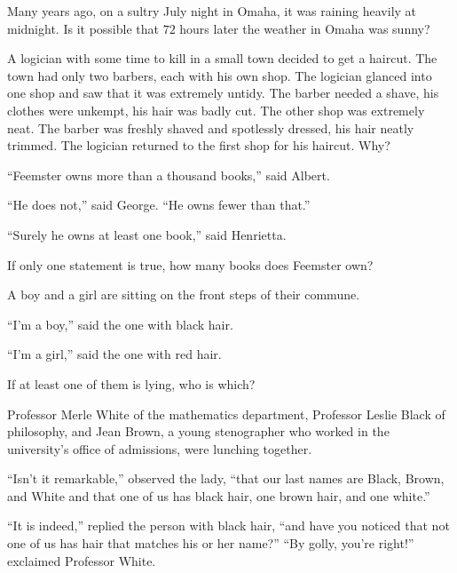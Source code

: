 \documentclass[11pt]{exam}
\begin{document}
 \headrule


\begin{questions}
\question Many years ago, on a sultry July night in Omaha, it was raining 
heavily at midnight. Is it possible that $72$ hours later the weather in 
Omaha was sunny?

\newpage


\question A logician with some time to kill in a small town decided to get a 
haircut. The town had only two barbers, each with his own shop. The 
logician glanced into one shop and saw that it was extremely untidy. 
The barber needed a shave, his clothes were unkempt, his hair was 
badly cut. The other shop was extremely neat. The barber was freshly 
shaved and spotlessly dressed, his hair neatly trimmed. The logician 
returned to the first shop for his haircut. Why? 


\newpage

\question ``Feemster owns more than a thousand books,'' said Albert. 

``He does not,'' said George. ``He owns fewer than that.'' 

``Surely he owns at least one book,'' said Henrietta. 

If only one statement is true, how many books does Feemster own? 

\newpage


\question A boy and a girl are sitting on the front steps of their commune. 

``I'm a boy,'' said the one with black hair. 

``I'm a girl,'' said the one with red hair. 

If at least one of them is lying, who is which? 

\newpage

\question  Professor Merle White of the mathematics department, Professor 
Leslie Black of philosophy, and Jean Brown, a young stenographer 
who worked in the university's office of admissions, were lunching 
together. 

``Isn't it remarkable,'' observed the lady, ``that our last names are 
Black, Brown, and White and that one of us has black hair, one brown 
hair, and one white.'' 

``It is indeed,'' replied the person with black hair, ``and have you 
noticed that not one of us has hair that matches his or her name?''
``By golly, you're right!'' exclaimed Professor White. 


\end{questions}
\end{document}
